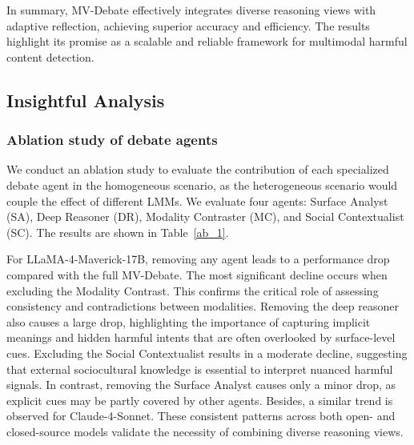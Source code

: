 \documentclass[letterpaper]{article} %
\begin{document}
In summary, MV-Debate effectively integrates diverse reasoning views with adaptive reflection, achieving superior accuracy and efficiency. The results highlight its promise as a scalable and reliable framework for multimodal harmful content detection.











\subsection{Insightful Analysis}

\subsubsection{Ablation study of debate agents}

We conduct an ablation study to evaluate the contribution of each specialized debate agent in the homogeneous scenario, as the heterogeneous scenario would couple the effect of different LMMs. We evaluate four agents: Surface Analyst (SA), Deep Reasoner (DR), Modality Contraster (MC), and Social Contextualist (SC). The results are shown in Table~\ref{ab_1}.  

For LLaMA-4-Maverick-17B, removing any agent leads to a performance drop compared with the full MV-Debate. The most significant decline occurs when excluding the Modality Contrast. This confirms the critical role of assessing consistency and contradictions between modalities. Removing the deep reasoner also causes a large drop, highlighting the importance of capturing implicit meanings and hidden harmful intents that are often overlooked by surface-level cues. Excluding the Social Contextualist results in a moderate decline, suggesting that external sociocultural knowledge is essential to interpret nuanced harmful signals. In contrast, removing the Surface Analyst causes only a minor drop, as explicit cues may be partly covered by other agents.  Besides,  a similar trend is observed for Claude-4-Sonnet. 
These consistent patterns across both open- and closed-source models validate the necessity of combining diverse reasoning views.  
\end{document}
